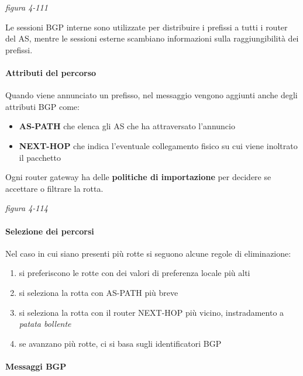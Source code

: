 \documentclass[
]{article}
\begin{document}
\emph{figura 4-111}

Le sessioni BGP interne sono utilizzate per distribuire i prefissi a
tutti i router del AS, mentre le sessioni esterne scambiano informazioni
sulla raggiungibilità dei prefissi.

\hypertarget{header-n328}{%
\paragraph{Attributi del percorso}\label{header-n328}}

Quando viene annunciato un prefisso, nel messaggio vengono aggiunti
anche degli attributi BGP come:

\begin{itemize}
\item
  \textbf{AS-PATH} che elenca gli AS che ha attraversato l'annuncio
\item
  \textbf{NEXT-HOP} che indica l'eventuale collegamento fisico su cui
  viene inoltrato il pacchetto
\end{itemize}

Ogni router gateway ha delle \textbf{politiche di importazione} per
decidere se accettare o filtrare la rotta.

\emph{figura 4-114}

\hypertarget{header-n330}{%
\paragraph{Selezione dei percorsi}\label{header-n330}}

Nel caso in cui siano presenti più rotte si seguono alcune regole di
eliminazione:

\begin{enumerate}
\def\labelenumi{\arabic{enumi}.}
\item
  si preferiscono le rotte con dei valori di preferenza locale più alti
\item
  si seleziona la rotta con AS-PATH più breve
\item
  si seleziona la rotta con il router NEXT-HOP più vicino, instradamento
  a \emph{patata bollente}
\item
  se avanzano più rotte, ci si basa sugli identificatori BGP
\end{enumerate}

\hypertarget{header-n327}{%
\paragraph{Messaggi BGP}\label{header-n327}}
\end{document}
